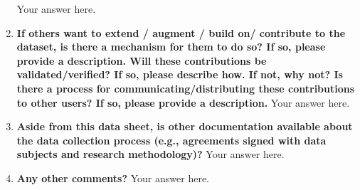 \documentclass{article}
\begin{document}
\begin{enumerate}[leftmargin=0.65cm]
        \newline 
        Your answer here.
        \newline 
        \item \textbf{If others want to extend / augment / build on/ contribute to the dataset, is there a mechanism for them to do so? If so, please provide a description. Will these contributions be validated/verified? If so, please describe how. If not, why not? Is there a process for communicating/distributing these contributions to other users? If so, please provide a description.}
        \newline 
        Your answer here.
        \newline 
        \item \textbf{Aside from this data sheet, is other documentation available about the data collection process (e.g., agreements signed with data subjects and research methodology)?}
        \newline 
        Your answer here.
        \newline 
        \item \textbf{Any other comments?}
        \newline 
        Your answer here.
        \newline 
    \end{enumerate}
\end{document}
